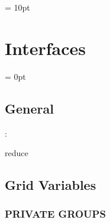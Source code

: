 \vspace{0.5cm}\parskip = 10pt 

\section{Interfaces} 


\parskip = 0pt

\vspace{3mm} \subsection*{General}

: 

reduce
\vspace{2mm}
\subsection*{Grid Variables}
\vspace{5mm}\subsubsection{PRIVATE GROUPS}

\vspace{5mm}

